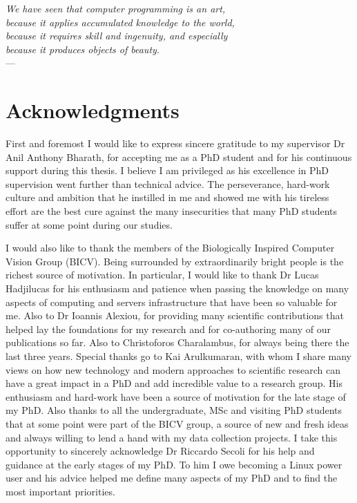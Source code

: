 
\begin{flushright}{\slshape    
    We have seen that computer programming is an art, \\ 
    because it applies accumulated knowledge to the world, \\ 
    because it requires skill and ingenuity, and especially \\
    because it produces objects of beauty.} \\ \medskip
    ---  \citep{knuth:1974}
\end{flushright}



\bigskip

\begingroup
\let\clearpage\relax
\let\cleardoublepage\relax
\let\cleardoublepage\relax
\chapter*{Acknowledgments}

First and foremost I would like to express sincere gratitude to my supervisor Dr Anil Anthony Bharath, for accepting me as a PhD student and for his continuous support during this thesis. I believe I am privileged as his excellence in PhD supervision went further than technical advice. The perseverance, hard-work culture and ambition that he instilled in me and showed me with his tireless effort are the best cure against the many insecurities that many PhD students suffer at some point during our studies.

I would also like to thank the members of the Biologically Inspired Computer Vision Group (BICV). Being surrounded by extraordinarily bright people is the richest source of motivation. In particular, I would like to thank Dr Lucas Hadjilucas for his enthusiasm and patience when passing the knowledge on many aspects of computing and servers infrastructure that have been so valuable for me. Also to Dr Ioannis Alexiou, for providing many scientific contributions that helped lay the foundations for my research and for co-authoring many of our publications so far. Also to Christoforos Charalambus, for always being there the last three years. Special thanks go to Kai Arulkumaran, with whom I share many views on how new technology and modern approaches to scientific research can have a great impact in a PhD and add incredible value to a research group. His enthusiasm  and hard-work have been a source of motivation for the late stage of my PhD. Also thanks to all the undergraduate, MSc and visiting PhD students that at some point were part of the BICV group, a source of new and fresh ideas and always willing to lend a hand with my data collection projects. I take this opportunity to sincerely acknowledge Dr Riccardo Secoli for his help and guidance at the early stages of my PhD. To him I owe becoming a Linux power user and his advice helped me define many aspects of my PhD and to find the most important priorities.



\endgroup



